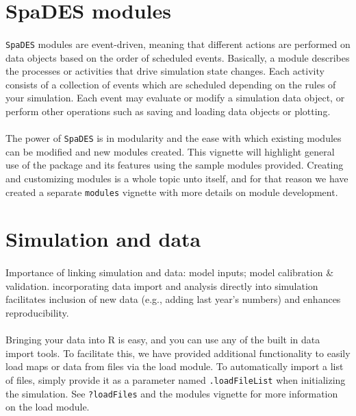 \documentclass{article}
\begin{document}
\newpage

\section{SpaDES modules}

\paragraph{}
\texttt{SpaDES} modules are event-driven, meaning that different actions are performed on data objects based on the order of scheduled events. Basically, a module describes the processes or activities that drive simulation state changes. Each activity consists of a collection of events which are scheduled depending on the rules of your simulation. Each event may evaluate or modify a simulation data object, or perform other operations such as saving and loading data objects or plotting.

\paragraph{}
The power of \texttt{SpaDES} is in modularity and the ease with which existing modules can be modified and new modules created. This vignette will highlight general use of the package and its features using the sample modules provided. Creating and customizing modules is a whole topic unto itself, and for that reason we have created a separate \texttt{modules} vignette with more details on module development.

\section{Simulation and data}

\paragraph{}
Importance of linking simulation and data: model inputs; model calibration \& validation. incorporating data import and analysis directly into simulation facilitates inclusion of new data (e.g., adding last year's numbers) and enhances reproducibility.

\paragraph{}
Bringing your data into R is easy, and you can use any of the built in data import tools. To facilitate this, we have provided additional functionality to easily load maps or data from files via the load module. To automatically import a list of files, simply provide it as a parameter named \texttt{.loadFileList} when initializing the simulation. See \texttt{?loadFiles} and the modules vignette for more information on the load module.
\end{document}
